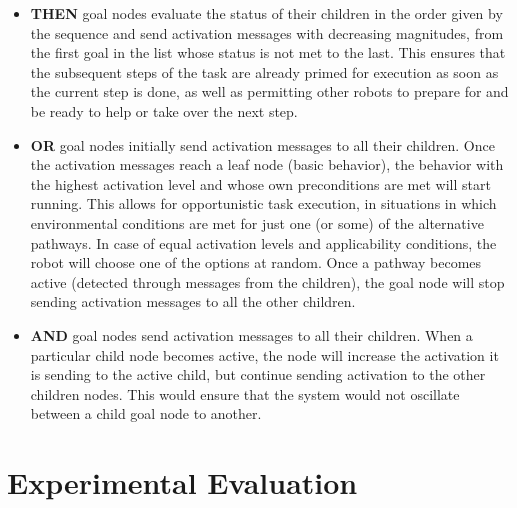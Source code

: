 \documentclass[conference]{article}
\begin{document}
\begin{itemize}

\item {\bf THEN} goal nodes evaluate the status of their children in the order given by the sequence and send activation messages with decreasing magnitudes, from the first goal in the list whose status is not met to the last. This ensures that the subsequent steps of the task are already primed for execution as soon as the current step is done, as well as permitting other robots to prepare for and be ready to help or take over the next step.  

\item {\bf OR} goal nodes initially send activation messages to all their children. Once the activation messages reach a leaf node (basic behavior), the behavior with the highest activation level and whose own preconditions are met will start running. This allows for opportunistic task execution, in situations in which environmental conditions are met for just one (or some) of the alternative pathways. In case of equal activation levels and applicability conditions, the robot will choose one of the options at random. Once a pathway becomes active (detected through messages from the children), the goal node will stop sending activation messages to all the other children.

\item {\bf AND} goal nodes send activation messages to all their children. When a particular child node becomes active, the node will increase the activation it is sending to the active child, but continue sending activation to the other children nodes. This would ensure that the system would not oscillate between a child goal node to another.
\end{itemize}

\section{Experimental Evaluation}
\label{evaluation}
\end{document}
